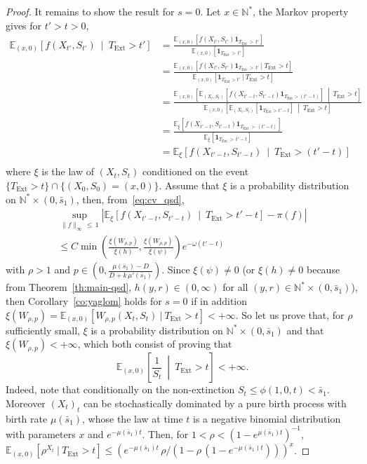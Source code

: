 \documentclass[AHL,Unicode,longabstracts,published]{cedram}
\newcommand{\NN}{\mathbb{N}}
\newcommand{\EE}{\mathbb{E}}
\newcommand{\Text}{T_{\mathrm{Ext}}}
\newcommand{\1}{\mathbf{1}}
\begin{document}
\begin{proof}
It remains to show the result for $s=0$. Let $x\in \NN^*$, the Markov property gives for $t'>t>0$,
\begin{align*}
\EE_{(x,0)} \left[f(X_{t'},S_{t'}) \ \middle| \ \Text>t'\right] &=\frac{\EE_{(x,0)} \left[f\left(X_{t'},S_{t'}\right) \1_{\Text\,>\,t'} \right]}{\EE_{(x,0)} \left[\1_{\Text\,>\,t'}\right]}\\
& =\frac{\EE_{(x,0)} \left[f(X_{t'},S_{t'}) \1_{\Text\,>\,t'} \ | \ \Text> t \right]}{\EE_{(x,0)} \left[\1_{\Text>t'} \ | \ \Text> t\right]}\\
&=\frac{\EE_{(x,0)} \left[\EE_{\left(X_{t},S_{t}\right)}\left[f\left(X_{t'-t},S_{t'-t}\right) \1_{\Text>(t'-t)} \right] \ \middle| \ \Text> t \right]}{\EE_{(x,0)} \left[\EE_{(X_{t},S_{t})}\left[\1_{\Text>t'-t} \right] \ \middle| \ \Text> t \right]}\\
&=\frac{\EE_{\xi} \left[f\left(X_{t'-t},S_{t'-t}\right) \1_{\Text\,>\,(t'-t)} \right]}{\EE_{\xi} \left[\1_{\Text\,>\,t'-t} \right] }\\
&=\EE_{\xi} \left[f(X_{t'-t},S_{t'-t}) \ \middle| \ \Text>(t'-t) \right]\\
\end{align*}
where $\xi$ is the law of $(X_{t},S_{t})$ conditioned on the event $\{ \Text> t \}\cap\{(X_0,S_0)=(x,0)\}$. Assume that $\xi$ is a probability distribution on $\NN^*\times (0,\bar s_1)$, then, from~\eqref{eq:cv_qsd},
\begin{multline*}
\sup_{\|f \|_\infty\,\leq\,1 } \left|\EE_{\xi} \left[f(X_{t'-t},S_{t'-t}) \ \middle| \ \Text>t'-t\right] - \pi(f) \right| \\
\leq C \min\left(\frac{\xi\left(W_{\rho,p}\right)}{\xi(h)}, \frac{\xi\left(W_{\rho,p}\right)}{\xi(\psi)}\right) e^{-\omega (t'-t)}
\end{multline*}
with $\rho>1$ and $p\in(0,\frac{\mu(\bar s_1)-D}{D+k\,\mu'(\bar s_1)})$. Since $\xi(\psi)\neq 0$ (or $\xi(h)\neq 0$ because from Theorem~\ref{th:main-qsd}, $h(y,r)\in(0,\infty)$ for all $(y,r)\in\NN^*\times (0,\bar s_1)$), then Corollary~\ref{co:yaglom} holds for $s=0$ if in addition $\xi(W_{\rho,p})=\EE_{(x,0)}[W_{\rho,p}(X_t,S_t) \ | \ \Text> t]<+\infty$. So let us prove that, for $\rho$ sufficiently small, $\xi$ is a probability distribution on $\NN^*\times (0,\bar s_1)$ and that $\xi(W_{\rho,p})<+\infty$, which both consist of proving that
\[
\EE_{(x,0)}\left[\frac{1}{S_t} \ \middle| \ \Text >t\right] <+\infty.
\]
Indeed, note that conditionally on the non-extinction $S_t\leq \phi(1,0,t)< \bar s_1$. Moreover $(X_t)_t$ can be stochastically dominated by a pure birth process with birth rate $\mu(\bar s_1)$, whose the law at time $t$ is a negative binomial distribution with parameters $x$ and $e^{- \mu(\bar s_1) t}$. Then, for $1<\rho<(1-e^{\mu(\bar s_1)t})^{-1}$, $\EE_{(x,0)}[\rho^{X_t} \ | \ \Text >t]\leq (e^{- \mu(\bar s_1) t}\,\rho /(1- \rho\,(1-e^{- \mu(\bar s_1) t})))^x$.



\end{proof}
\end{document}
